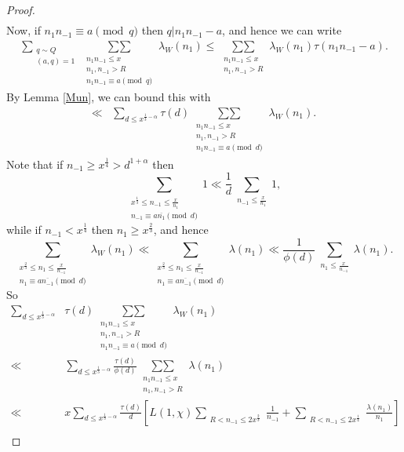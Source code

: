 \documentclass[10pt,a4paper]{amsart}
\begin{document}
\begin{proof}
\begin{align*}
\end{align*}
Now, if $n_1n_{-1}\equiv a \pmod q$ then $q|n_1n_{-1}-a$, and hence we can write
\begin{align*}
\sum_{\substack{q\sim Q  \\ (a,q)=1}}\mathop{\sum\sum}\limits_{\substack{n_1n_{-1}\leq x \\ n_1,n_{-1}>R \\ n_1n_{-1}\equiv a\pmod q}}\lambda_W\left(n_1\right) \leq \mathop{\sum\sum}\limits_{\substack{n_1n_{-1}\leq x \\ n_1,n_{-1}>R }}\lambda_W\left(n_1\right) \tau(n_1n_{-1}-a).
\end{align*}
By Lemma \ref{Mun}, we can bound this with
\begin{align*}
\ll &\sum_{d\leq x^{\frac 13-\alpha}} \tau(d)\mathop{\sum\sum}\limits_{\substack{n_1n_{-1}\leq x \\ n_1,n_{-1}>R \\ n_1n_{-1}\equiv a\pmod d}}\lambda_W\left(n_1\right) .
\end{align*}
Note that if $n_{-1}\geq x^\frac 14>d^{1+\alpha}$ then
$$\sum_{\substack{x^{\frac 13}\leq n_{-1}\leq \frac x{n_1} \\ n_{-1}\equiv a\overline{n_1}\pmod d}}1\ll \frac 1d\sum_{\substack{n_{-1}\leq \frac x{n_1} }}1,$$
while if $n_{-1}<x^\frac 14$ then $n_{1}\geq x^\frac 23$, and hence
$$\sum_{\substack{x^{\frac 23}\leq n_1\leq \frac x{n_{-1}} \\ n_{1}\equiv a\overline{n_{-1}}\pmod d}}\lambda_W(n_1)\ll \sum_{\substack{x^{\frac 23}\leq n_1\leq \frac x{n_{-1}} \\ n_{1}\equiv a\overline{n_{-1}}\pmod d}}\lambda(n_1)\ll  \frac 1{\phi(d)}\sum_{\substack{n_1\leq \frac x{n_{-1}} }}\lambda(n_1).$$
So
\begin{align*}
\sum_{d\leq x^{\frac 13-\alpha}} &\tau(d)\mathop{\sum\sum}\limits_{\substack{n_1n_{-1}\leq x \\ n_1,n_{-1}>R \\ n_1n_{-1}\equiv a\pmod d}}\lambda_W\left(n_1\right) \\
\ll &\sum_{d\leq x^{\frac 13-\alpha}} \frac{\tau(d)}{\phi(d)}\mathop{\sum\sum}\limits_{\substack{n_1n_{-1}\leq x \\ n_1,n_{-1}>R }}\lambda\left(n_1\right) \\
\ll &x\sum_{d\leq x^{\frac 13-\alpha}} \frac{\tau(d)}{d}\left[L(1,\chi)\mathop{\sum}\limits_{\substack{ R<n_{-1}\leq 2x^\frac 23}}\frac{1}{n_{-1}}+\mathop{\sum}\limits_{\substack{R<n_{-1}\leq 2x^\frac 14}}\frac{\lambda(n_1)}{n_{1}}\right]\\

\end{align*}
\end{proof}
\end{document}
